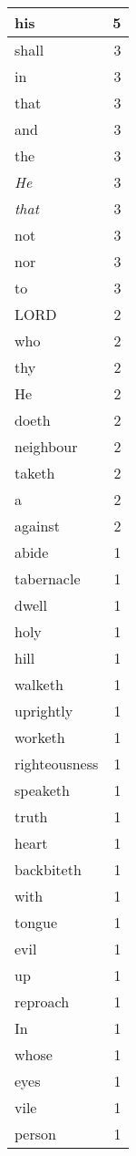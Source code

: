 \begin{center}
\begin{longtable}{l|r}
\hline \hline
\endlastfoot
his & 5 \\ \hline
shall & 3 \\ \hline
in & 3 \\ \hline
that & 3 \\ \hline
and & 3 \\ \hline
the & 3 \\ \hline
\emph{He} & 3 \\ \hline
\emph{that} & 3 \\ \hline
not & 3 \\ \hline
nor & 3 \\ \hline
to & 3 \\ \hline
LORD & 2 \\ \hline
who & 2 \\ \hline
thy & 2 \\ \hline
He & 2 \\ \hline
doeth & 2 \\ \hline
neighbour & 2 \\ \hline
taketh & 2 \\ \hline
a & 2 \\ \hline
against & 2 \\ \hline
abide & 1 \\ \hline
tabernacle & 1 \\ \hline
dwell & 1 \\ \hline
holy & 1 \\ \hline
hill & 1 \\ \hline
walketh & 1 \\ \hline
uprightly & 1 \\ \hline
worketh & 1 \\ \hline
righteousness & 1 \\ \hline
speaketh & 1 \\ \hline
truth & 1 \\ \hline
heart & 1 \\ \hline
backbiteth & 1 \\ \hline
with & 1 \\ \hline
tongue & 1 \\ \hline
evil & 1 \\ \hline
up & 1 \\ \hline
reproach & 1 \\ \hline
In & 1 \\ \hline
whose & 1 \\ \hline
eyes & 1 \\ \hline
vile & 1 \\ \hline
person & 1 \\ \hline

\end{longtable}
\end{center}
